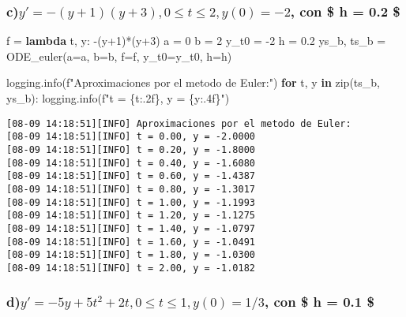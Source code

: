 \documentclass[
  letterpaper,
  DIV=11,
  numbers=noendperiod]{scrartcl}
\newenvironment{Shaded}{\begin{snugshade}}{\end{snugshade}}
\newcommand{\BuiltInTok}[1]{\textcolor[rgb]{0.00,0.23,0.31}{#1}}
\newcommand{\ControlFlowTok}[1]{\textcolor[rgb]{0.00,0.23,0.31}{\textbf{#1}}}
\newcommand{\DecValTok}[1]{\textcolor[rgb]{0.68,0.00,0.00}{#1}}
\newcommand{\FloatTok}[1]{\textcolor[rgb]{0.68,0.00,0.00}{#1}}
\newcommand{\KeywordTok}[1]{\textcolor[rgb]{0.00,0.23,0.31}{\textbf{#1}}}
\newcommand{\NormalTok}[1]{\textcolor[rgb]{0.00,0.23,0.31}{#1}}
\newcommand{\OperatorTok}[1]{\textcolor[rgb]{0.37,0.37,0.37}{#1}}
\newcommand{\SpecialCharTok}[1]{\textcolor[rgb]{0.37,0.37,0.37}{#1}}
\newcommand{\SpecialStringTok}[1]{\textcolor[rgb]{0.13,0.47,0.30}{#1}}
\begin{document}
\subsubsection{\texorpdfstring{c)\(y' = -(y+1)(y+3), 0 \leq t \leq 2 ,  y(0) = -2\),
con \$ h = 0.2
\$}{c)y\textquotesingle{} = -(y+1)(y+3), 0 \textbackslash leq t \textbackslash leq 2 ,  y(0) = -2, con \$ h = 0.2 \$}}\label{cy--y1y3-0-leq-t-leq-2-y0--2-con-h-0.2}

\begin{Shaded}
\begin{Highlighting}[]
\NormalTok{f }\OperatorTok{=} \KeywordTok{lambda}\NormalTok{ t, y: }\OperatorTok{{-}}\NormalTok{(y}\OperatorTok{+}\DecValTok{1}\NormalTok{)}\OperatorTok{*}\NormalTok{(y}\OperatorTok{+}\DecValTok{3}\NormalTok{)}
\NormalTok{a }\OperatorTok{=} \DecValTok{0} 
\NormalTok{b }\OperatorTok{=} \DecValTok{2}  
\NormalTok{y\_t0 }\OperatorTok{=} \OperatorTok{{-}}\DecValTok{2} 
\NormalTok{h }\OperatorTok{=} \FloatTok{0.2} 
\NormalTok{ys\_b, ts\_b }\OperatorTok{=}\NormalTok{ ODE\_euler(a}\OperatorTok{=}\NormalTok{a, b}\OperatorTok{=}\NormalTok{b, f}\OperatorTok{=}\NormalTok{f, y\_t0}\OperatorTok{=}\NormalTok{y\_t0, h}\OperatorTok{=}\NormalTok{h)}

\NormalTok{logging.info(}\SpecialStringTok{f"Aproximaciones por el metodo de Euler:"}\NormalTok{)}
\ControlFlowTok{for}\NormalTok{ t, y }\KeywordTok{in} \BuiltInTok{zip}\NormalTok{(ts\_b, ys\_b):}
\NormalTok{    logging.info(}\SpecialStringTok{f"t = }\SpecialCharTok{\{}\NormalTok{t}\SpecialCharTok{:.2f\}}\SpecialStringTok{, y = }\SpecialCharTok{\{}\NormalTok{y}\SpecialCharTok{:.4f\}}\SpecialStringTok{"}\NormalTok{)}
\end{Highlighting}
\end{Shaded}

\begin{verbatim}
[08-09 14:18:51][INFO] Aproximaciones por el metodo de Euler:
[08-09 14:18:51][INFO] t = 0.00, y = -2.0000
[08-09 14:18:51][INFO] t = 0.20, y = -1.8000
[08-09 14:18:51][INFO] t = 0.40, y = -1.6080
[08-09 14:18:51][INFO] t = 0.60, y = -1.4387
[08-09 14:18:51][INFO] t = 0.80, y = -1.3017
[08-09 14:18:51][INFO] t = 1.00, y = -1.1993
[08-09 14:18:51][INFO] t = 1.20, y = -1.1275
[08-09 14:18:51][INFO] t = 1.40, y = -1.0797
[08-09 14:18:51][INFO] t = 1.60, y = -1.0491
[08-09 14:18:51][INFO] t = 1.80, y = -1.0300
[08-09 14:18:51][INFO] t = 2.00, y = -1.0182
\end{verbatim}

\subsubsection{\texorpdfstring{d)\(y' = -5y+5t^2+2t, 0 \leq t \leq 1 ,  y(0) = 1/3\),
con \$ h = 0.1
\$}{d)y\textquotesingle{} = -5y+5t\^{}2+2t, 0 \textbackslash leq t \textbackslash leq 1 ,  y(0) = 1/3, con \$ h = 0.1 \$}}\label{dy--5y5t22t-0-leq-t-leq-1-y0-13-con-h-0.1}
\end{document}
